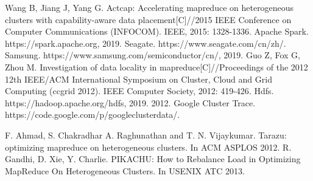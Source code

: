 \documentclass[conference]{IEEEtran}
\begin{document}
\begin{thebibliography}{00}
 Wang B, Jiang J, Yang G. Actcap: Accelerating mapreduce on heterogeneous clusters with capability-aware data placement[C]//2015 IEEE Conference on Computer Communications (INFOCOM). IEEE, 2015: 1328-1336.
 Apache Spark. https://spark.apache.org, 2019.
Seagate. https://www.seagate.com/cn/zh/.
Samsung. https://www.samsung.com/semiconductor/cn/, 2019.
Guo Z, Fox G, Zhou M. Investigation of data locality in mapreduce[C]//Proceedings of the 2012 12th IEEE/ACM International Symposium on Cluster, Cloud and Grid Computing (ccgrid 2012). IEEE Computer Society, 2012: 419-426.
 Hdfs. https://hadoop.apache.org/hdfs, 2019.
 2012. Google Cluster Trace. https://code.google.com/p/googleclusterdata/.

 F. Ahmad, S. Chakradhar A. Raghunathan and T. N. Vijaykumar. Tarazu: optimizing mapreduce on heterogeneous clusters. In ACM ASPLOS 2012.
 R. Gandhi, D. Xie, Y. Charlie. PIKACHU: How to Rebalance Load in Optimizing MapReduce On Heterogeneous Clusters. In USENIX ATC 2013.

\end{thebibliography}
\end{document}
